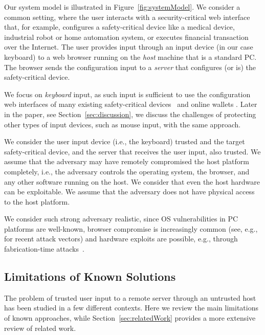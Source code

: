 Our system model is illustrated in Figure~\ref{fig:systemModel}. We consider a common setting, where the user interacts with a security-critical web interface that, for example, configures a safety-critical device like a medical device, industrial robot or home automation system, or executes financial transaction over the Internet. The user provides input through an input device (in our case keyboard) to a web browser running on the \emph{host} machine that is a standard PC. The browser sends the configuration input to a \emph{server} that configures (or is) the safety-critical device.

We focus on \emph{keyboard} input, as such input is sufficient to use the configuration web interfaces of many existing safety-critical devices~\cite{7306669,controlbyweb,siemens,siemens2,schneider} and online wallets \cite{bitgo,bitcoinwallet,coin,blockchain,coinbase}. Later in the paper, see Section~\ref{sec:discussion}, we discuss the challenges of protecting other types of input devices, such as mouse input, with the same approach.

 We consider the user input device (i.e., the keyboard) trusted and the target safety-critical device, and the server that receives the user input, also trusted. We assume that the adversary may have remotely compromised the host platform completely, i.e., the adversary controls the operating system, the browser, and any other software running on the host. We consider that even the host hardware can be exploitable. We assume that the adversary does not have physical access to the host platform.

We consider such strong adversary realistic, since OS vulnerabilities in PC platforms are well-known, browser compromise is increasingly common (see, e.g.,~\cite{provos2007ghost,dougan2012man} for recent attack vectors) and hardware exploits are possible, e.g., through fabrication-time attacks~\cite{Lin2009,a2}. 

\subsection{Limitations of Known Solutions}

The problem of trusted user input to a remote server through an untrusted host has been studied in a few different contexts. Here we review the main limitations of known approaches, while Section~\ref{sec:relatedWork} provides a more extensive review of related work.


